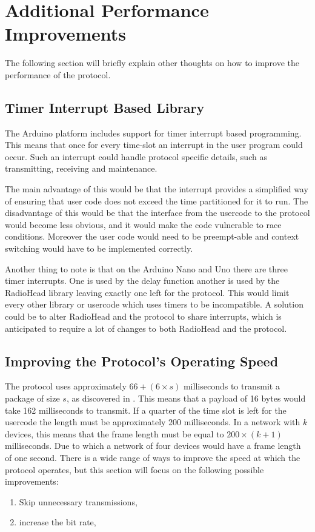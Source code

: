 \section{Additional Performance Improvements}
The following section will briefly explain other thoughts on how to improve the performance of the protocol.
\subsection{Timer Interrupt Based Library}
The Arduino platform includes support for timer interrupt based programming.
This means that once for every time-slot an interrupt in the user program could occur.
Such an interrupt could handle protocol specific details, such as transmitting, receiving and maintenance.

The main advantage of this would be that the interrupt provides a simplified way of ensuring that user code does not exceed the time partitioned for it to run.
The disadvantage of this would be that the interface from the usercode to the protocol would become less obvious, and it would make the code vulnerable to race conditions.
Moreover the user code would need to be preempt-able and context switching would have to be implemented correctly.

Another thing to note is that on the Arduino Nano and Uno there are three timer interrupts.
One is used by the delay function another is used by the RadioHead library leaving exactly one left for the protocol.
This would limit every other library or usercode which uses timers to be incompatible.
A solution could be to alter RadioHead and the protocol to share interrupts, which is anticipated to require a lot of changes to both RadioHead and the protocol.

\subsection{Improving the Protocol's Operating Speed}
The protocol uses approximately $66 + (6 \times s)$ milliseconds to transmit a package of size $s$, as discovered in  . 
This means that a payload of 16 bytes would take 162 milliseconds to transmit.
If a quarter of the time slot is left for the usercode the length must be approximately 200 milliseconds.
In a network with $k$ devices, this means that the frame length must be equal to $200 \times (k + 1)$ milliseconds.
Due to which a network of four devices would have a frame length of one second.
There is a wide range of ways to improve the speed at which the protocol operates, but this section will focus on the following possible improvements:
\begin{enumerate}[label=\itshape \alph*\upshape)]
    \item Skip unnecessary transmissions,
    \item increase the bit rate, 
\end{enumerate} 


